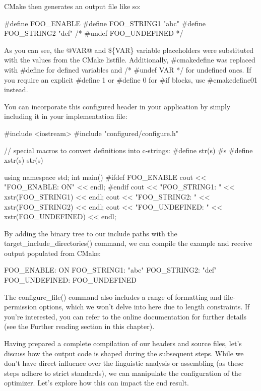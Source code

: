 CMake then generates an output file like so:


\begin{cpp}
#define FOO_ENABLE
#define FOO_STRING1 "abc"
#define FOO_STRING2 "def"
/* #undef FOO_UNDEFINED */
\end{cpp}

As you can see, the @VAR@ and \$\{VAR\} variable placeholders were substituted with the values from the CMake listfile. Additionally, \#cmakedefine was replaced with \#define for defined variables and /* \#undef VAR */ for undefined ones. If you require an explicit \#define 1 or \#define 0 for \#if blocks, use \#cmakedefine01 instead.

You can incorporate this configured header in your application by simply including it in your implementation file:


\begin{cpp}
#include <iostream>
#include "configured/configure.h"

// special macros to convert definitions into c-strings:
#define str(s) #s
#define xstr(s) str(s)

using namespace std;
int main()
{
#ifdef FOO_ENABLE
    cout << "FOO_ENABLE: ON" << endl;
#endif
    cout << "FOO_STRING1: " << xstr(FOO_STRING1) << endl;
    cout << "FOO_STRING2: " << xstr(FOO_STRING2) << endl;
    cout << "FOO_UNDEFINED: " << xstr(FOO_UNDEFINED) << endl;
}
\end{cpp}

By adding the binary tree to our include paths with the target\_include\_directories() command, we can compile the example and receive output populated from CMake:

\begin{shell}
FOO_ENABLE: ON
FOO_STRING1: "abc"
FOO_STRING2: "def"
FOO_UNDEFINED: FOO_UNDEFINED
\end{shell}

The configure\_file() command also includes a range of formatting and file-permission options, which we won’t delve into here due to length constraints. If you’re interested, you can refer to the online documentation for further details (see the Further reading section in this chapter).

Having prepared a complete compilation of our headers and source files, let’s discuss how the output code is shaped during the subsequent steps. While we don’t have direct influence over the linguistic analysis or assembling (as these steps adhere to strict standards), we can manipulate the configuration of the optimizer. Let’s explore how this can impact the end result.






